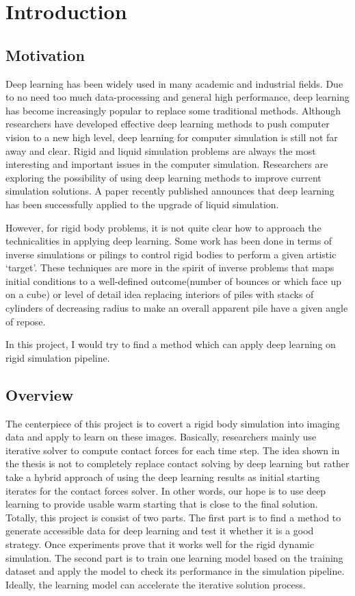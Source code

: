 \chapter{Introduction}

\section{Motivation}

    Deep learning has been widely used in many academic and industrial fields. Due to no need too much data-processing and general high performance, deep learning has become increasingly popular to replace some traditional methods. Although researchers have developed effective deep learning methods to push computer vision to a new high level, deep learning for computer simulation is still not far away and clear. Rigid and liquid simulation problems are always the most interesting and important issues in the computer simulation. Researchers are exploring the possibility of using deep learning methods to improve current simulation solutions. A paper recently published announces that deep learning has been successfully applied to the upgrade of liquid simulation\cite{CNNFluid2016}.

    However, for rigid body problems, it is not quite clear how to approach the technicalities in applying deep learning. Some work has been done in terms of inverse simulations or pilings to control rigid bodies to perform a given artistic `target'. These techniques are more in the spirit of inverse problems that maps initial conditions to a well-defined outcome(number of bounces or which face up on a cube) or level of detail idea replacing interiors of piles with stacks of cylinders of decreasing radius to make an overall apparent pile have a given angle of repose.

    In this project, I would try to find a method which can apply deep learning on rigid simulation pipeline.

\section{Overview}
        The centerpiece of this project is to covert a rigid body simulation into imaging data and apply to learn on these images. Basically, researchers mainly use iterative solver to compute contact forces for each time step. The idea shown in the thesis is not to completely replace contact solving by deep learning but rather take a hybrid approach of using the deep learning results as initial starting iterates for the contact forces solver. In other words, our hope is to use deep learning to provide usable warm starting that is close to the final solution. Totally, this project is consist of two parts. The first part is to find a method to generate accessible data for deep learning and test it whether it is a good strategy. Once experiments prove that it works well for the rigid dynamic simulation. The second part is to train one learning model based on the training dataset and apply the model to check its performance in the simulation pipeline. Ideally, the learning model can accelerate the iterative solution process.


